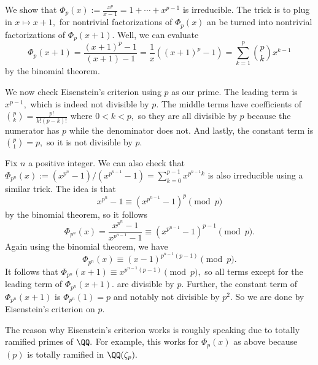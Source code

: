 \documentclass[../notes.tex]{subfiles}
\begin{document}
\begin{example}
	We show that $\Phi_p(x):=\frac{x^p}{x-1}=1+\cdots+x^{p-1}$ is irreducible. The trick is to plug in $x\mapsto x+1,$ for nontrivial factorizations of $\Phi_p(x)$ an be turned into nontrivial factorizations of $\Phi_p(x+1).$ Well, we can evaluate
	\[\Phi_p(x+1)=\frac{(x+1)^p-1}{(x+1)-1}=\frac1x\left((x+1)^p-1\right)=\sum_{k=1}^p\binom pkx^{k-1}\]
	by the binomial theorem.
	
	We now check Eisenstein's criterion using $p$ as our prime. The leading term is $x^{p-1},$ which is indeed not divisible by $p.$ The middle terms have coefficients of $\binom pk=\frac{p!}{k!(p-k)!}$ where $0<k<p,$ so they are all divisible by $p$ because the numerator has $p$ while the denominator does not. And lastly, the constant term is $\binom p1=p,$ so it is not divisible by $p.$
\end{example}
\begin{example}
	Fix $n$ a positive integer. We can also check that $\Phi_{p^n}(x):=\left(x^{p^n}-1\right)/\left(x^{p^{n-1}}-1\right)=\sum_{k=0}^{p-1}x^{p^{n-1}k}$ is also irreducible using a similar trick. The idea is that
	\[x^{p^n}-1\equiv\left(x^{p^{n-1}}-1\right)^p\pmod p\]
	by the binomial theorem, so it follows
	\[\Phi_{p^n}(x)=\frac{x^{p^n}-1}{x^{p^{n-1}}-1}\equiv\left(x^{p^{n-1}}-1\right)^{p-1}\pmod p.\]
	Again using the binomial theorem, we have
	\[\Phi_{p^n}(x)\equiv(x-1)^{p^{n-1}(p-1)}\pmod p.\]
	It follows that $\Phi_{p^n}(x+1)\equiv x^{p^{n-1}(p-1)}\pmod p,$ so all terms except for the leading term of $\Phi_{p^n}(x+1).$ are divisible by $p.$ Further, the constant term of $\Phi_{p^n}(x+1)$ is $\Phi_{p^n}(1)=p$ and notably not divisible by $p^2.$ So we are done by Eisenstein's criterion on $p.$
\end{example}
\begin{remark}
	The reason why Eisenstein's criterion works is roughly speaking due to totally ramified primes of $\QQ.$ For example, this works for $\Phi_p(x)$ as above because $(p)$ is totally ramified in $\QQ(\zeta_p).$
\end{remark}
\end{document}
